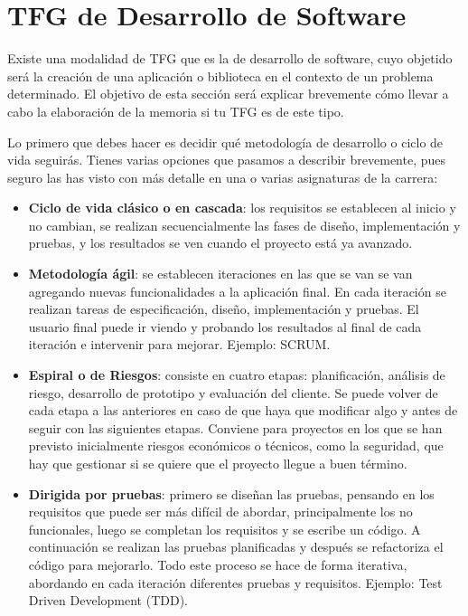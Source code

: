 \section{TFG de Desarrollo de Software}
\label{apendice:desarrollo}

Existe una modalidad de TFG que es la de desarrollo de software, cuyo objetido será la creación de una aplicación o biblioteca en el contexto de un problema determinado. El objetivo de esta sección será explicar brevemente cómo llevar a cabo la elaboración de la memoria si tu TFG es de este tipo.

Lo primero que debes hacer es decidir qué metodología de desarrollo o ciclo de vida seguirás. Tienes varias opciones que pasamos a describir brevemente, pues seguro las has visto con más detalle en una o varias asignaturas de la carrera: 
\begin{itemize}
    \item \textbf{Ciclo de vida clásico o en cascada}: los requisitos se establecen al inicio y no cambian, se realizan secuencialmente las fases de diseño, implementación y pruebas, y los resultados se ven cuando el proyecto está ya avanzado. 
     \item \textbf{Metodología ágil}: se establecen iteraciones en las que se van se van agregando nuevas funcionalidades a la aplicación final. En cada iteración se realizan tareas de especificación, diseño, implementación y pruebas. El usuario final puede ir viendo y probando los resultados al final de cada iteración e intervenir para mejorar. Ejemplo: SCRUM.
     \item \textbf{Espiral o de Riesgos}: consiste en cuatro etapas: planificación, análisis de riesgo, desarrollo de prototipo y evaluación del cliente. Se puede volver de cada etapa a las anteriores en caso de que haya que modificar algo y antes de seguir con las siguientes etapas. Conviene para proyectos en los que se han previsto inicialmente riesgos económicos o técnicos, como la seguridad, que hay que gestionar si se quiere que el proyecto llegue a buen término.
     \item \textbf{Dirigida por pruebas}: primero se diseñan las pruebas, pensando en los requisitos que puede ser más difícil de abordar, principalmente los no funcionales, luego se completan los requisitos y se escribe un código. A continuación se realizan las pruebas planificadas y después se refactoriza el código para mejorarlo. Todo este proceso se hace de forma iterativa, abordando en cada iteración diferentes pruebas y requisitos. Ejemplo: Test Driven Development (TDD).

\end{itemize}

